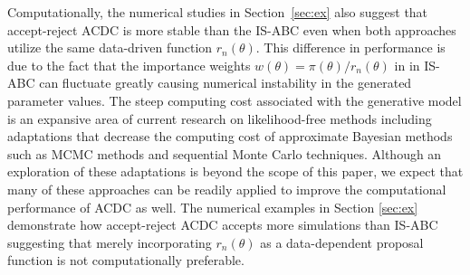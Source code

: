 
Computationally, the numerical studies in Section~\ref{sec:ex} also suggest that 
accept-reject ACDC %
is more stable than the IS-ABC %
even when both approaches utilize the same data-driven function $r_{n}(\theta)$. This difference in performance is due to the fact that the importance weights  $w(\theta)=\pi(\theta)/r_{n}(\theta)$ in in IS-ABC %
can fluctuate greatly causing numerical instability in the generated parameter values. %
The steep computing cost associated with the generative model is an expansive area of current research on likelihood-free methods including adaptations that decrease the computing cost of approximate Bayesian methods %
such as MCMC methods \cite[]{marjoram2003markov} and sequential Monte Carlo techniques\cite[]{Sisson2007}. Although an exploration of these adaptations is beyond the scope of this paper, we expect that many of these approaches can be readily applied to improve the computational performance of ACDC as well. %
The numerical examples in Section \ref{sec:ex} 
demonstrate how accept-reject ACDC 
accepts more simulations than IS-ABC
suggesting that merely incorporating $r_n(\theta)$ as a data-dependent proposal function is not computationally preferable. 



